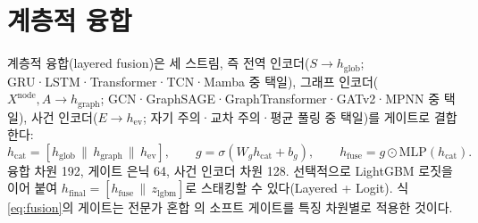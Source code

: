 
\section{계층적 융합}
\label{sec:model-fusion}

계층적 융합(layered fusion)은 세 스트림, 즉 전역 인코더($S \to h_{\mathrm{glob}}$; GRU·LSTM·Transformer·TCN·Mamba 중 택일), 그래프 인코더($X^{\mathrm{node}}, A \to h_{\mathrm{graph}}$; GCN·GraphSAGE·GraphTransformer·GATv2·MPNN 중 택일), 사건 인코더($E \to h_{\mathrm{ev}}$; 자기 주의·교차 주의·평균 풀링 중 택일)를 게이트로 결합한다:
\begin{equation}
  h_{\mathrm{cat}} = [h_{\mathrm{glob}} \,\|\, h_{\mathrm{graph}} \,\|\, h_{\mathrm{ev}}], \qquad
  g = \sigma(W_g h_{\mathrm{cat}} + b_g), \qquad
  h_{\mathrm{fuse}} = g \odot \mathrm{MLP}(h_{\mathrm{cat}}).
  \label{eq:fusion}
\end{equation}
융합 차원 192, 게이트 은닉 64, 사건 인코더 차원 128. 선택적으로 LightGBM 로짓을 이어 붙여 $h_{\mathrm{final}} = [h_{\mathrm{fuse}} \,\|\, z_{\mathrm{lgbm}}]$로 스태킹할 수 있다(Layered + Logit). 식 \eqref{eq:fusion}의 게이트는 전문가 혼합 \cite{shazeer2017outrageously,ma2018modeling}의 소프트 게이트를 특징 차원별로 적용한 것이다.
